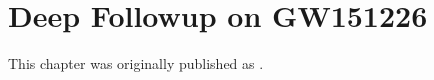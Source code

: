 \chapter[GW151226 Deep-Followup]{Deep Followup on GW151226}

This chapter was originally published as \cite{}.



